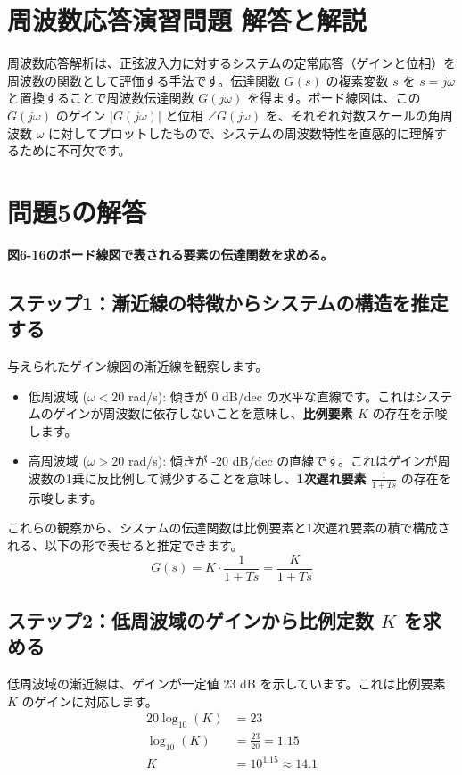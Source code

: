 \documentclass[11pt,a4paper]{ltjsarticle} %
\begin{document}
\section*{周波数応答演習問題 解答と解説}

周波数応答解析は、正弦波入力に対するシステムの定常応答（ゲインと位相）を周波数の関数として評価する手法です。伝達関数 $G(s)$ の複素変数 $s$ を $s=j\omega$ と置換することで周波数伝達関数 $G(j\omega)$ を得ます。ボード線図は、この $G(j\omega)$ のゲイン $|G(j\omega)|$ と位相 $\angle G(j\omega)$ を、それぞれ対数スケールの角周波数 $\omega$ に対してプロットしたもので、システムの周波数特性を直感的に理解するために不可欠です。

\section{問題5の解答}
\textbf{図6-16のボード線図で表される要素の伝達関数を求める。}

\subsection*{ステップ1：漸近線の特徴からシステムの構造を推定する}
与えられたゲイン線図の漸近線を観察します。
\begin{itemize}
    \item 低周波域 ($\omega < 20$ rad/s): 傾きが 0 dB/dec の水平な直線です。これはシステムのゲインが周波数に依存しないことを意味し、\textbf{比例要素 $K$} の存在を示唆します。
    \item 高周波域 ($\omega > 20$ rad/s): 傾きが -20 dB/dec の直線です。これはゲインが周波数の1乗に反比例して減少することを意味し、\textbf{1次遅れ要素 $\frac{1}{1+Ts}$} の存在を示唆します。
\end{itemize}
これらの観察から、システムの伝達関数は比例要素と1次遅れ要素の積で構成される、以下の形で表せると推定できます。
\begin{equation}
    G(s) = K \cdot \frac{1}{1+Ts} = \frac{K}{1+Ts}
\end{equation}

\subsection*{ステップ2：低周波域のゲインから比例定数 $K$ を求める}
低周波域の漸近線は、ゲインが一定値 23 dB を示しています。これは比例要素 $K$ のゲインに対応します。
\begin{align*}
    20 \log_{10}(K) &= 23 \\
    \log_{10}(K) &= \frac{23}{20} = 1.15 \\
    K &= 10^{1.15} \approx 14.1
\end{align*}
\end{document}
